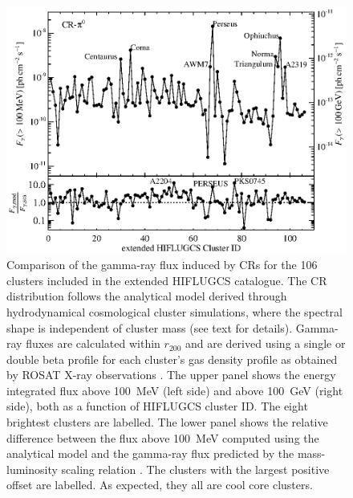 \documentclass[10pt,aps,pra,reprint,amsmath,amsfonts,amssymb,showpacs,nofootinbib,floatfix]{revtex4-1}
\newcommand{\rvir}{r_{200}}
\begin{document}
\begin{figure}%
\begin{minipage}{2.0\columnwidth}
 \includegraphics[width=0.99\columnwidth]{figures/Flux.comp.CR.eps}
 \caption{Comparison of the gamma-ray flux induced by CRs for the
   106 clusters included in the extended HIFLUGCS catalogue. The CR
   distribution follows the analytical model derived through
   hydrodynamical cosmological cluster simulations, where the spectral
   shape is independent of cluster mass \protect
   \cite{2010MNRAS.409..449P} (see text for details). Gamma-ray fluxes
   are calculated within $\rvir$ and are derived using a single or
   double beta profile for each cluster's gas density profile as
   obtained by ROSAT X-ray observations
   \cite{2007A&A...466..805C}. The upper panel shows the energy
   integrated flux above 100~MeV (left side) and above 100~GeV (right
   side), both as a function of HIFLUGCS cluster ID. The eight
   brightest clusters are labelled. The lower panel shows the relative
   difference between the flux above 100~MeV computed using the
   analytical model and the gamma-ray flux predicted by the
   mass-luminosity scaling relation \cite{2010MNRAS.409..449P}. The
   clusters with the largest positive offset are labelled. As
   expected, they all are cool core clusters.}
 \label{fig19}
\end{minipage}
\end{figure}
\end{document}

